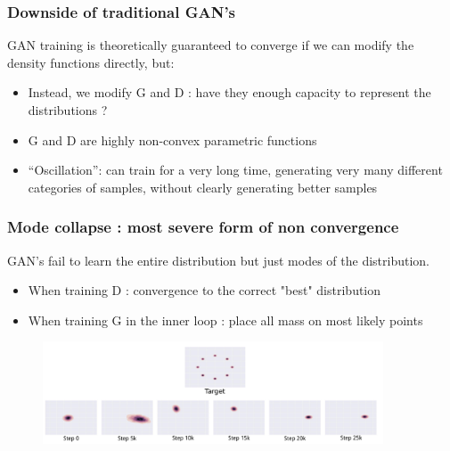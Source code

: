 \documentclass[french,9pt]{beamer}
\begin{document}
\begin{frame}
\frametitle{Downside of traditional GAN's}

GAN training is theoretically guaranteed to converge if we can modify the density functions directly, but:

\begin{itemize}
\item Instead, we modify G and D  : have they enough capacity to represent the distributions ?
\item  G and D are highly non-convex parametric functions
\item “Oscillation”: can train for a very long time, generating very many different categories of samples, without clearly generating better samples
\end{itemize}

\end{frame}



\begin{frame}
\frametitle{Mode collapse : most severe form of non convergence}
GAN's fail to learn the entire distribution but just modes of the distribution.

\begin{itemize}
\item When training D : convergence to the correct "best" distribution
\item When training G in the inner loop : place all mass on most likely points
\end{itemize}
 \begin{figure}
  \begin{center}
    \includegraphics[width=0.9\textwidth]{fig/mode_collapse}
  \end{center}
\end{figure}
\end{frame}

\end{document}
